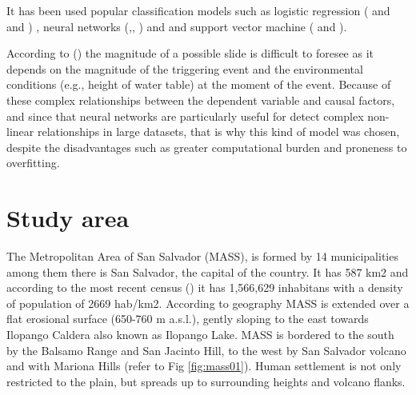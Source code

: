 \documentclass[11pt,twoside]{rmta2010esp}%
\begin{document}
It has been used popular classification models such as logistic regression (\cite{akgun2012} and \cite{gaskill} and \cite{garcia2008} ) , neural networks (\cite{Melchiorre2011410},\cite{Zeng2001374}, \cite{Ermini2005327}) and \cite{Yesilnacar2005251} and support vector machine (\cite{ballabio2012support} and \cite{tien2012landslide}). 


According to (\cite{van2006landslide}) the magnitude of a possible
slide is difficult to foresee as it depends on the magnitude of the triggering event and the environmental conditions (e.g., height of water table) at the moment of the event. Because of these complex relationships between the dependent variable and causal factors, and since that neural networks are particularly useful for detect complex non-linear relationships in large datasets, that is why this kind of model was chosen, despite the disadvantages such as greater computational burden and proneness to overfitting.  





\section{Study area}
\label{sec:studyarea}
The Metropolitan Area of San Salvador (MASS), is formed by 14 municipalities among them there is San Salvador, the capital of the country. It has 587 km2 and according to the most recent census (\cite{minecon}) it has 1,566,629 inhabitans with a density of population of 2669 hab/km2.  According to geography MASS is extended over a flat erosional surface (650-760 m a.s.l.), gently sloping to the east towards Ilopango Caldera also known as Ilopango Lake. MASS is bordered to the south by the Balsamo Range and San Jacinto Hill, to the west by San Salvador volcano and with Mariona Hills (refer to Fig \ref{fig:mass01}). Human settlement is not only restricted to the plain, but spreads up to surrounding heights and volcano flanks.
\end{document}
